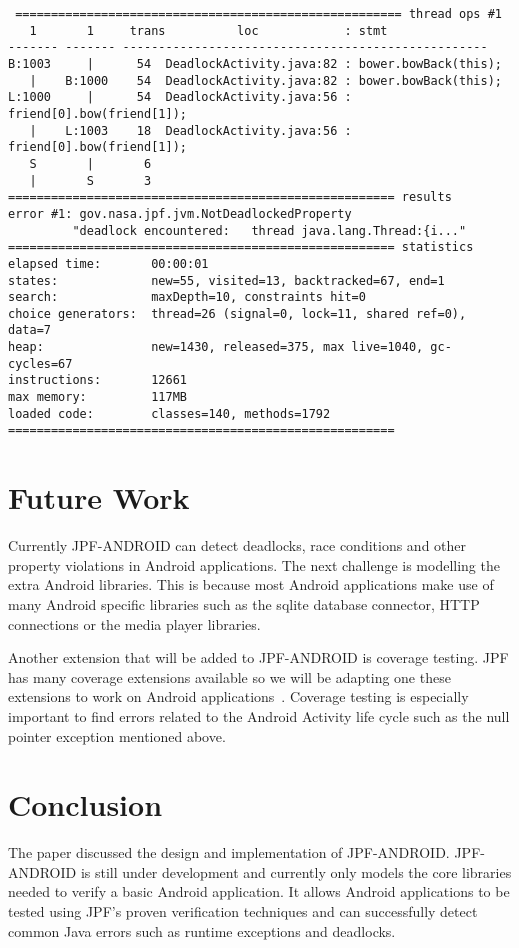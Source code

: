 \documentclass{acm_proc_article-sp}
\begin{document}
\vspace*{-10pt}
\begingroup
 \fontsize{6pt}{7pt}\selectfont
\begin{verbatim}
 ====================================================== thread ops #1
   1       1     trans          loc            : stmt
------- ------- ---------------------------------------------------
B:1003     |      54  DeadlockActivity.java:82 : bower.bowBack(this);
   |    B:1000    54  DeadlockActivity.java:82 : bower.bowBack(this);
L:1000     |      54  DeadlockActivity.java:56 : friend[0].bow(friend[1]);
   |    L:1003    18  DeadlockActivity.java:56 : friend[0].bow(friend[1]);
   S       |       6
   |       S       3
====================================================== results
error #1: gov.nasa.jpf.jvm.NotDeadlockedProperty 
         "deadlock encountered:   thread java.lang.Thread:{i..."
====================================================== statistics
elapsed time:       00:00:01
states:             new=55, visited=13, backtracked=67, end=1
search:             maxDepth=10, constraints hit=0
choice generators:  thread=26 (signal=0, lock=11, shared ref=0), data=7
heap:               new=1430, released=375, max live=1040, gc-cycles=67
instructions:       12661
max memory:         117MB
loaded code:        classes=140, methods=1792
======================================================
\end{verbatim}
\endgroup
\vspace*{-10pt}
\section{Future Work}
Currently JPF-ANDROID can detect deadlocks, race conditions and other property violations in Android applications. The next challenge is
modelling the extra Android libraries. This is because most Android applications make use of many Android specific
libraries such as the sqlite database connector, HTTP connections or the media player libraries.

Another extension that will be added to JPF-ANDROID is coverage testing. JPF has many coverage extensions available so we will be adapting
one these extensions to work on Android applications~\cite{coverage}. Coverage testing is especially important to find errors related to the Android Activity
life cycle such as the null pointer exception mentioned above.

\section{Conclusion}
The paper discussed the design and implementation of JPF-ANDROID. JPF-ANDROID is still under development and currently only models
the core libraries needed to verify a basic Android application. It allows Android applications to be tested using JPF's proven verification
techniques and can successfully detect common Java errors such as runtime exceptions and deadlocks.
\end{document}
